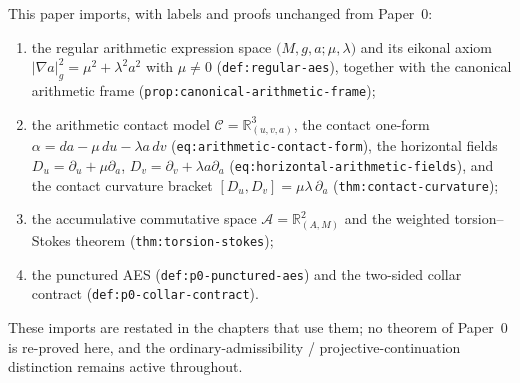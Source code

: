 This paper imports, with labels and proofs unchanged from Paper~0:
\begin{enumerate}
  \item the regular arithmetic expression space
  $\bigl(M,g,a;\mu,\lambda\bigr)$ and its eikonal axiom
  $|\nabla a|_g^2=\mu^2+\lambda^2 a^2$ with $\mu\ne0$
  (\texttt{def:regular-aes}), together with the canonical arithmetic frame
  (\texttt{prop:canonical-arithmetic-frame});
  \item the arithmetic contact model $\mathcal C=\mathbb R^3_{(u,v,a)}$, the
  contact one-form $\alpha=da-\mu\,du-\lambda a\,dv$
  (\texttt{eq:arithmetic-contact-form}), the horizontal fields
  $D_u=\partial_u+\mu\partial_a$, $D_v=\partial_v+\lambda a\partial_a$
  (\texttt{eq:horizontal-arithmetic-fields}), and the contact curvature bracket
  $[D_u,D_v]=\mu\lambda\,\partial_a$ (\texttt{thm:contact-curvature});
  \item the accumulative commutative space $\mathcal A=\mathbb R^2_{(A,M)}$ and
  the weighted torsion--Stokes theorem (\texttt{thm:torsion-stokes});
  \item the punctured AES (\texttt{def:p0-punctured-aes}) and the two-sided
  collar contract (\texttt{def:p0-collar-contract}).
\end{enumerate}
These imports are restated in the chapters that use them; no theorem of Paper~0
is re-proved here, and the ordinary-admissibility / projective-continuation
distinction remains active throughout.
